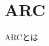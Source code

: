 \documentclass[../../../main]{subfiles}
\begin{document}
    \section{ARC}\label{sec:phraseology-arc}

    ARCとは
\end{document}

